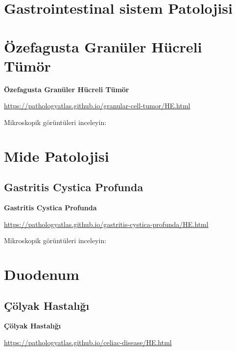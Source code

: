 \documentclass[
  letterpaper,
  DIV=11,
  numbers=noendperiod]{scrreprt}
\begin{document}
\hypertarget{gastrointestinal-sistem-patolojisi-1}{%
\chapter{Gastrointestinal sistem
Patolojisi}\label{gastrointestinal-sistem-patolojisi-1}}

\hypertarget{uxf6zefagusta-granuxfcler-huxfccreli-tuxfcmuxf6r}{%
\chapter{Özefagusta Granüler Hücreli
Tümör}\label{uxf6zefagusta-granuxfcler-huxfccreli-tuxfcmuxf6r}}

\textbf{Özefagusta Granüler Hücreli Tümör}

\url{https://pathologyatlas.github.io/granular-cell-tumor/HE.html}

Mikroskopik görüntüleri inceleyin:

\hypertarget{mide-patolojisi}{%
\chapter{Mide Patolojisi}\label{mide-patolojisi}}

\hypertarget{gastritis-cystica-profunda}{%
\section{Gastritis Cystica Profunda}\label{gastritis-cystica-profunda}}

\textbf{Gastritis Cystica Profunda}

\url{https://pathologyatlas.github.io/gastritis-cystica-profunda/HE.html}

Mikroskopik görüntüleri inceleyin:

\hypertarget{duodenum}{%
\chapter{Duodenum}\label{duodenum}}

\hypertarget{uxe7uxf6lyak-hastalux131ux11fux131}{%
\section{Çölyak Hastalığı}\label{uxe7uxf6lyak-hastalux131ux11fux131}}

\textbf{Çölyak Hastalığı}

\url{https://pathologyatlas.github.io/celiac-disease/HE.html}
\end{document}
